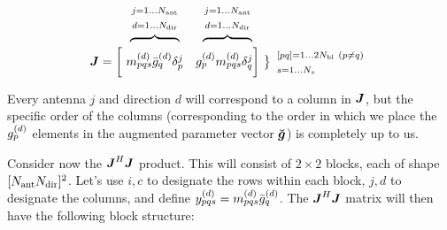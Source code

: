 \documentclass[useAMS,usenatbib]{mn2e}
\makeatletter
\newcommand{\mat}[1]{{\bmath{#1}}}
\newcommand{\JJ}{\mat{J}} %
\newcommand{\JHJ}{\JJ^H\JJ} %
\newcommand{\Stack}[1]{\begin{array}{@{}c@{}}#1\end{array}}
\newcommand{\AUG}[1]{\bmath{\breve{#1}}}
\newcommand{\Gg}{\AUG{g}}
\numberwithin{equation}{section} %
\providecommand{\DIFaddbegin}{} %
\providecommand{\DIFaddend}{} %
\providecommand{\DIFdelbegin}{} %
\providecommand{\DIFdelend}{} %
\makeatother
\begin{document}
\DIFdelend \DIFaddbegin \begin{equation}
\DIFaddend \begin{array}{r@{~}cc@{~}cc}
 & \overbrace{~~~~~~~~~~~~}^{\Stack{\scriptstyle j=1\dots \Na\\\scriptstyle d=1\dots \Nd}} & 
   \overbrace{~~~~~~~~~~~~}^{\Stack{\scriptstyle j=1\dots \Na\\\scriptstyle d=1\dots \Nd}} \\
\JJ = \bigg [ &
  \mmd_{pqs}\ggdH_q \delta^j_p & 
  \ggd_p \mmd_{pqs}  \delta^j_q 
\bigg ] &
\big \}
\begin{array}{l}
\scriptstyle [pq]=1\dots 2\Nbl~(p\ne q)\\ \scriptstyle s=1\dots\Ns
\end{array}
\DIFdelbegin %

\DIFdelend \end{array}
\DIFdelbegin %
\end{equation}%

\begin{equation}%
\DIFdelend \DIFaddbegin \end{equation}
\DIFaddend Every antenna $j$ and direction $d$ will correspond to a column in $\JJ$, but the specific order of the columns 
(corresponding to the order in which we place the $g^{(d)}_p$ elements in the augmented parameter vector $\Gg$)
is completely up to us. 

Consider now the $\JHJ$ product. This will consist of $2\times2$ blocks, each of shape 
$[N_\mathrm{ant}N_\mathrm{dir}]^2$. Let's use $i,c$ to designate the rows within each block, $j,d$ to designate the columns, 
and define $y^{(d)}_{pqs}=m^{(d)}_{pqs}\bar{g}^{(d)}_q$. The $\JHJ$ matrix will then have the following block 
structure:
\DIFdelbegin %
\end{document}
